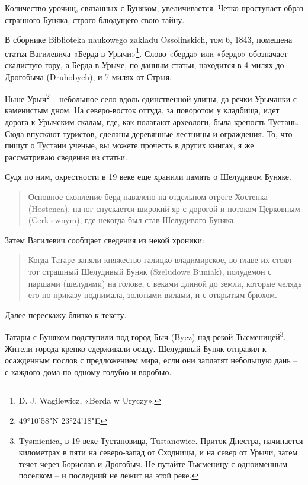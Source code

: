 Количество урочищ, связанных с Буняком, увеличивается. Четко проступает образ странного Буняка, строго блюдущего свою тайну.

В сборнике Biblioteka naukowego zakladu Ossolinskich, том 6, 1843, помещена статья Вагилевича «Берда в Урычи»\footnote{D. J. Wagilewicz, «Berda w Uryczy».}. Слово «берда» или «бердо» обозначает скалистую гору, а Берда в Урыче, по данным статьи, находится в 4 милях до Дрогобыча (Druhobych), и 7 милях от Стрыя. 

Ныне Урыч\footnote{49°10'58"N 23°24'18"E} – небольшое село вдоль единственной улицы, да речки Урычанки с каменистым дном. На северо-восток оттуда, за поворотом у кладбища, идет дорога к Урычским скалам, где, как полагают археологи, была крепость Тустань. Сюда впускают туристов, сделаны деревянные лестницы и ограждения. То, что пишут о Тустани ученые, вы можете прочесть в других книгах, я же рассматриваю сведения из статьи.

Судя по ним, окрестности в 19 веке еще хранили память о Шелудивом Буняке. 

\begin{quotation}
Основное скопление берд навалено на отдельном отроге Хостенка (Hostenca), на юг спускается широкий яр с дорогой и потоком Церковным (Cerkiewnym), где некогда был став Шелудивого Буняка.
\end{quotation}

Затем Вагилевич сообщает сведения из некой хроники:


\begin{quotation}
Когда Татаре заняли княжество галицко-владимирское, во главе их стоял тот страшный Шелудивый Буняк (Szeludowe Buniak), полудемон с паршами (шелудями) на голове, с веками длиной до земли, которые челядь его по приказу поднимала,  золотыми вилами, и с открытым брюхом.\end{quotation}

Далее перескажу близко к тексту. 

Татары с Буняком подступили под город Быч (Bycz) над рекой Тысменицей\footnote{Tysmienica, в 19 веке Тустановица, Tustanowice. Приток Днестра, начинается километрах в пяти на северо-запад от Сходницы, и на север от Урычи, затем течет через Борислав и Дрогобыч. Не путайте Тысменицу с одноименным поселком – и последний не лежит на этой реке.}. Жители города крепко сдерживали осаду. Шелудивый Буняк отправил к осажденным послов с предложением мира, если они заплатят небольшую дань – с каждого дома по одному голубю и воробью.

